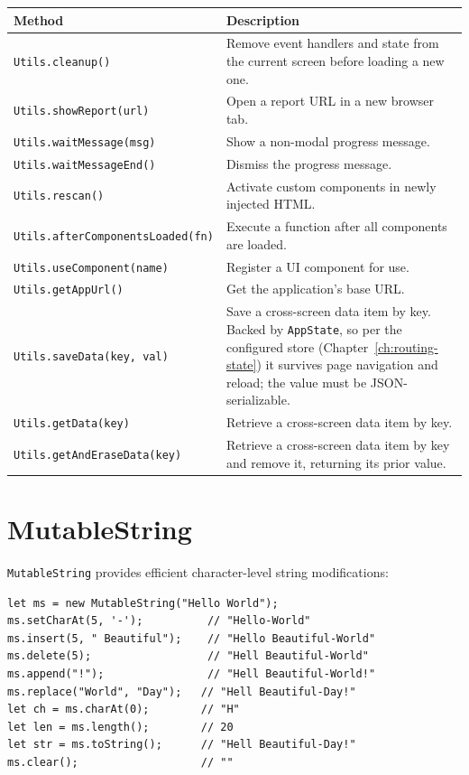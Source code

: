 \begin{longtable}{P{4.8cm}P{5.7cm}}
\toprule
\textbf{Method} & \textbf{Description} \\
\midrule
\endhead
\texttt{Utils.cleanup()} & Remove event handlers and state from the current screen before loading a new one. \\
\texttt{Utils.showReport(url)} & Open a report URL in a new browser tab. \\
\texttt{Utils.waitMessage(msg)} & Show a non-modal progress message. \\
\texttt{Utils.waitMessageEnd()} & Dismiss the progress message. \\
\texttt{Utils.rescan()} & Activate custom components in newly injected HTML. \\
\texttt{Utils.\allowbreak afterComponentsLoaded(\allowbreak fn)} & Execute a function after all components are loaded. \\
\texttt{Utils.\allowbreak useComponent(\allowbreak name)} & Register a UI component for use. \\
\texttt{Utils.getAppUrl()} & Get the application's base URL. \\
\texttt{Utils.saveData(key, val)} & Save a cross-screen data item by key.  Backed by \texttt{AppState}, so per the configured store (Chapter~\ref{ch:routing-state}) it survives page navigation and reload; the value must be JSON-serializable. \\
\texttt{Utils.getData(key)} & Retrieve a cross-screen data item by key. \\
\texttt{Utils.\allowbreak getAndEraseData(\allowbreak key)} & Retrieve a cross-screen data item by key and remove it, returning its prior value. \\
\bottomrule
\end{longtable}

\section{MutableString}
\label{sec:feu-mutablestring}

\texttt{MutableString} provides efficient character-level string modifications:

\begin{lstlisting}[style=javascript]
let ms = new MutableString("Hello World");
ms.setCharAt(5, '-');          // "Hello-World"
ms.insert(5, " Beautiful");    // "Hello Beautiful-World"
ms.delete(5);                  // "Hell Beautiful-World"
ms.append("!");                // "Hell Beautiful-World!"
ms.replace("World", "Day");   // "Hell Beautiful-Day!"
let ch = ms.charAt(0);        // "H"
let len = ms.length();        // 20
let str = ms.toString();      // "Hell Beautiful-Day!"
ms.clear();                   // ""
\end{lstlisting}

